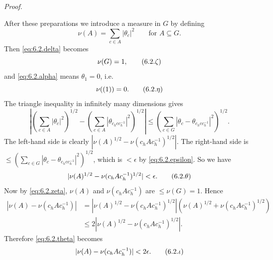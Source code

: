 \documentclass[b5paper,twoside]{article}
\theoremstyle{mvnplain}
\renewenvironment{proof}[1][Proof]{%
  \par\addvspace{0.35\baselineskip}%
  \noindent\textit{#1.}\ \normalfont\ignorespaces
}{%
  \par\addvspace{0.35\baselineskip}%
}
\def\mathfrak#1{#1}%
\begin{document}
\begin{proof}
After these preparations we introduce a measure in $\mathfrak G$ by defining
\[
  \nu(\mathfrak A)=\sum_{c\in\mathfrak A}|\theta_c|^2
  \qquad\text{for }\mathfrak A\subseteq\mathfrak G.
\]
Then \eqref{eq:6.2.delta} becomes
\begin{equation}
  \nu(\mathfrak G)=1,
  \tag{6.2.\ensuremath{\zeta}}\label{eq:6.2.zeta}
\end{equation}
and \eqref{eq:6.2.alpha} means $\theta_1=0$, i.e.
\begin{equation}
  \nu((1))=0.
  \tag{6.2.\ensuremath{\eta}}\label{eq:6.2.eta}
\end{equation}
The triangle inequality in infinitely many dimensions gives
\[
 \left|\left(\sum_{c\in\mathfrak A}|\theta_c|^2\right)^{1/2}
 -\left(\sum_{c\in\mathfrak A}|\theta_{c_hcc_h^{-1}}|^2\right)^{1/2}\right|
 \leq
 \left(\sum_{c\in\mathfrak G}
 |\theta_c-\theta_{c_hcc_h^{-1}}|^2\right)^{1/2}.
\]
The left-hand side is clearly
$|\nu(\mathfrak A)^{1/2}-\nu(c_h\mathfrak A c_h^{-1})^{1/2}|$. The
right-hand side is
$\leq(\sum_{c\in\mathfrak G}|\theta_c-
\theta_{c_hcc_h^{-1}}|^2)^{1/2}$, which is $<\epsilon$ by
\eqref{eq:6.2.epsilon}. So we have
\begin{equation}
  |\nu(\mathfrak A)^{1/2}
   -\nu(c_h\mathfrak A c_h^{-1})^{1/2}|<\epsilon.
  \tag{6.2.\ensuremath{\theta}}\label{eq:6.2.theta}
\end{equation}
Now by \eqref{eq:6.2.zeta}, $\nu(\mathfrak A)$ and
$\nu(c_h\mathfrak A c_h^{-1})$ are $\leq\nu(\mathfrak G)=1$. Hence
\begin{align*}
 |\nu(\mathfrak A)-\nu(c_h\mathfrak A c_h^{-1})|
 &=|\nu(\mathfrak A)^{1/2}-
   \nu(c_h\mathfrak A c_h^{-1})^{1/2}|
   (\nu(\mathfrak A)^{1/2}+
   \nu(c_h\mathfrak A c_h^{-1})^{1/2})\\
 &\leq2|\nu(\mathfrak A)^{1/2}-
   \nu(c_h\mathfrak A c_h^{-1})^{1/2}|.
\end{align*}
Therefore \eqref{eq:6.2.theta} becomes
\begin{equation}
 |\nu(\mathfrak A)-\nu(c_h\mathfrak A c_h^{-1})|<2\epsilon.
 \tag{6.2.\ensuremath{\iota}}\label{eq:6.2.iota}
\end{equation}


\end{proof}
\end{document}
